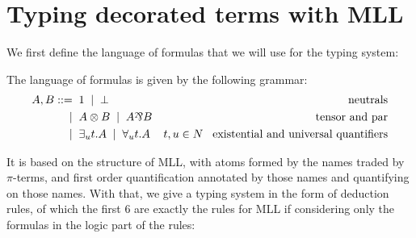 
\section{Typing decorated terms with MLL}

We first define the language of formulas that we will use for the typing system:
\begin{definition}
The language of formulas is given by the following grammar:
\begin{align*}
A,B::=	&\;\; 1 \;\; | \;\; \bot							& \text{neutrals}\\
	|	&\;\; A \logtensor B \;\; | \;\; A \logpar B		& \text{tensor and par}\\
	|	&\;\; \exists_ut.A \;\; | \;\; \forall_ut.A		& t,u\in N\;\;\; \text{existential and universal quantifiers}
\end{align*}
\end{definition}

It is based on the structure of MLL, with atoms formed by the names traded by $\pi$-terms, and first order quantification annotated by those names and quantifying on those names. With that, we give a typing system in the form of deduction rules, of which the first 6 are exactly the rules for MLL if considering only the formulas in the logic part of the rules: 


